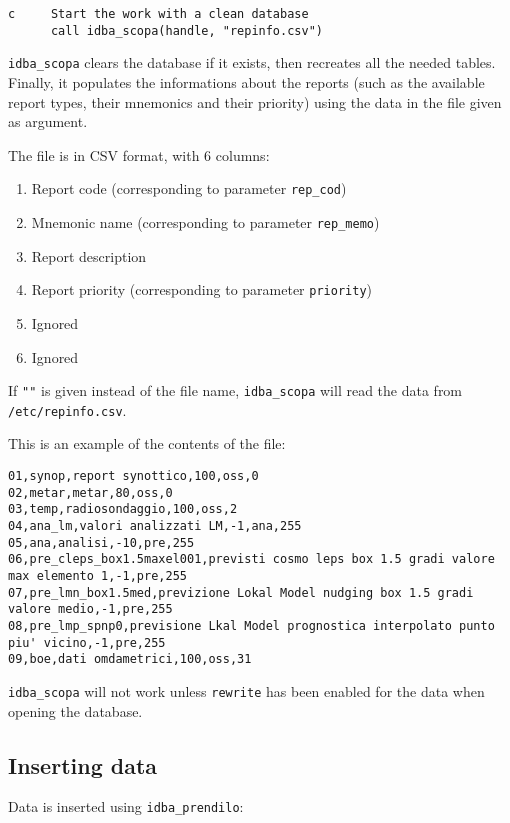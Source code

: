 \documentclass[draft,12pt,a4paper,twoside]{book}
\begin{document}
\begin{verbatim}
c     Start the work with a clean database
      call idba_scopa(handle, "repinfo.csv")
\end{verbatim}

{\tt idba\_scopa} clears the database if it exists, then recreates all the
needed tables.  Finally, it populates the informations about the reports (such
as the available report types, their mnemonics and their priority) using the
data in the file given as argument.

The file is in CSV format, with 6 columns:
\begin{enumerate}
\item Report code (corresponding to parameter {\tt rep\_cod})
\item Mnemonic name (corresponding to parameter {\tt rep\_memo})
\item Report description
\item Report priority (corresponding to parameter {\tt priority})
\item Ignored
\item Ignored
\end{enumerate}

If {\tt ""} is given instead of the file name, {\tt idba\_scopa} will read the
data from {\tt /etc/repinfo.csv}.

This is an example of the contents of the file:

\begin{verbatim}
01,synop,report synottico,100,oss,0
02,metar,metar,80,oss,0
03,temp,radiosondaggio,100,oss,2
04,ana_lm,valori analizzati LM,-1,ana,255
05,ana,analisi,-10,pre,255
06,pre_cleps_box1.5maxel001,previsti cosmo leps box 1.5 gradi valore max elemento 1,-1,pre,255
07,pre_lmn_box1.5med,previzione Lokal Model nudging box 1.5 gradi valore medio,-1,pre,255
08,pre_lmp_spnp0,previsione Lkal Model prognostica interpolato punto piu' vicino,-1,pre,255
09,boe,dati omdametrici,100,oss,31
\end{verbatim}

{\tt idba\_scopa} will not work unless {\tt rewrite} has been enabled for the
data when opening the database.


\subsection {Inserting data}

Data is inserted using {\tt idba\_prendilo}:
\label{fun-idba_prendilo}
         
\end{document}
